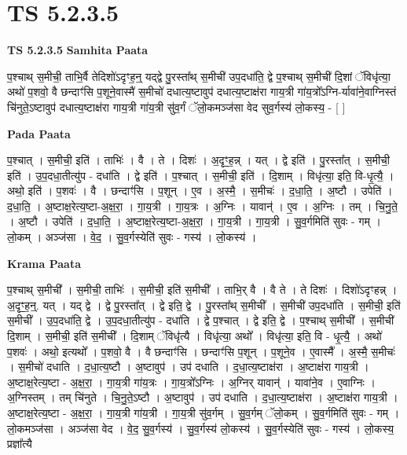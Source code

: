 \documentclass[17pt]{extarticle}
\begin{document}
\section{ TS 5.2.3.5 }

\textbf{TS 5.2.3.5 } \newline
\textbf{Samhita Paata} \newline

प॒श्चाथ् स॒मीची॒ ताभि॒र्वै तेदिशो॑ऽदृꣳह॒न्॒ यद्द्वे पु॒रस्ता᳚थ् स॒मीची॑ उप॒दधा॑ति॒ द्वे प॒॒श्चाथ् स॒मीची॑ दि॒शां ॅविधृ॑त्या॒ अथो॑ प॒शवो॒ वै छन्दाꣳ॑सि प॒शूने॒वास्मै॑ स॒मीचो॑ दधात्य॒ष्टावुप॑ दधात्य॒ष्टाक्ष॑रा गाय॒त्री गा॑य॒त्रो᳚ऽग्नि-र्यावा॑ने॒वाग्निस्तं चि॑नुते॒ऽष्टावुप॑ दधात्य॒ष्टाक्ष॑रा गाय॒त्री गा॑य॒त्री सु॑व॒र्गं ॅलो॒कमञ्ज॑सा वेद सुव॒र्गस्य॑ लो॒कस्य॒ - [  ] \newline

\textbf{Pada Paata} \newline

प॒श्चात् । स॒मीची॒ इति॑ । ताभिः॑ । वै । ते । दिशः॑ । अ॒दृꣳ॒॒ह॒न्न् । यत् । द्वे इति॑ । पु॒रस्ता᳚त् । स॒मीची॒ इति॑ । उ॒प॒दधा॒तीत्यु॑प - दधा॑ति । द्वे इति॑ । प॒श्चात् । स॒मीची॒ इति॑ । दि॒शाम् । विधृ॑त्या॒ इति॒ वि-धृ॒त्यै॒ । अथो॒ इति॑ । प॒शवः॑ । वै । छन्दाꣳ॑सि । प॒शून् । ए॒व । अ॒स्मै॒ । स॒मीचः॑ । द॒धा॒ति॒ । अ॒ष्टौ । उपेति॑ । द॒धा॒ति॒ । अ॒ष्टाक्ष॒रेत्य॒ष्टा-अ॒क्ष॒रा॒ । गा॒य॒त्री । गा॒य॒त्रः । अ॒ग्निः । यावान्॑ । ए॒व । अ॒ग्निः । तम् । चि॒नु॒ते॒ । अ॒ष्टौ । उपेति॑ । द॒धा॒ति॒ । अ॒ष्टाक्ष॒रेत्य॒ष्टा-अ॒क्ष॒रा॒ । गा॒य॒त्री । गा॒य॒त्री । सु॒व॒र्गमिति॑ सुवः - गम् । लो॒कम् । अञ्ज॑सा । वे॒द॒ । सु॒व॒र्गस्येति॑ सुवः - गस्य॑ । लो॒कस्य॑ ।  \newline


\textbf{Krama Paata} \newline

प॒श्चाथ् स॒मीची᳚ । स॒मीची॒ ताभिः॑ । स॒मीची॒ इति॑ स॒मीची᳚ । ताभि॒र् वै । वै ते । ते दिशः॑ । दिशो॑ऽदृꣳहन्न् । अ॒दृꣳ॒॒ह॒न्॒. यत् । यद् द्वे । द्वे पु॒रस्ता᳚त् । द्वे इति॒ द्वे । पु॒रस्ता᳚थ् स॒मीची᳚ । स॒मीची॑ उप॒दधा॑ति । स॒मीची॒ इति॑ स॒मीची᳚ । उ॒प॒दधा॑ति॒ द्वे । उ॒प॒दधा॒तीत्यु॑प - दधा॑ति । द्वे प॒श्चात् । द्वे इति॒ द्वे । प॒श्चाथ् स॒मीची᳚ । स॒मीची॑ दि॒शाम् । स॒मीची॒ इति॑ स॒मीची᳚ । दि॒शाम् ॅविधृ॑त्यै । विधृ॑त्या॒ अथो᳚ । विधृ॑त्या॒ इति॒ वि - धृ॒त्यै॒ । अथो॑ प॒शवः॑ । अथो॒ इत्यथो᳚ । प॒शवो॒ वै । वै छन्दाꣳ॑सि । छन्दाꣳ॑सि प॒शून् । प॒शूने॒व । ए॒वास्मै᳚ । अ॒स्मै॒ स॒मीचः॑ । स॒मीचो॑ दधाति । द॒धा॒त्य॒ष्टौ । अ॒ष्टावुप॑ । उप॑ दधाति । द॒धा॒त्य॒ष्टाक्ष॑रा । अ॒ष्टाक्ष॑रा गाय॒त्री । अ॒ष्टाक्ष॒रेत्य॒ष्टा - अ॒क्ष॒रा॒ । गा॒य॒त्री गा॑य॒त्रः । गा॒य॒त्रो᳚ऽग्निः । अ॒ग्निर् यावान्॑ । यावा॑ने॒व । ए॒वाग्निः । अ॒ग्निस्तम् । तम् चि॑नुते । चि॒नु॒ते॒ऽष्टौ । अ॒ष्टावुप॑ । उप॑ दधाति । द॒धा॒त्य॒ष्टाक्ष॑रा । अ॒ष्टाक्ष॑रा गाय॒त्री । अ॒ष्टाक्ष॒रेत्य॒ष्टा - अ॒क्ष॒रा॒ । गा॒य॒त्री गा॑य॒त्री । गा॒य॒त्री सु॑व॒र्गम् । सु॒व॒र्गम् ॅलो॒कम् । सु॒व॒र्गमिति॑ सुवः - गम् । लो॒कमञ्ज॑सा । अञ्ज॑सा वेद । वे॒द॒ सु॒व॒र्गस्य॑ । सु॒व॒र्गस्य॑ लो॒कस्य॑ । सु॒व॒र्गस्येति॑ सुवः - गस्य॑ । लो॒कस्य॒ प्रज्ञा᳚त्यै \newline
\end{document}
